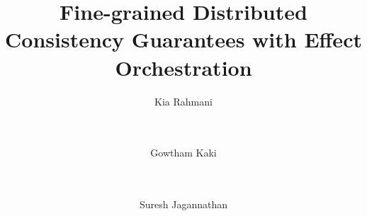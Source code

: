 \documentclass[authorversion]{sig-alternate-05-2015}
\begin{document}






\title{Fine-grained Distributed Consistency Guarantees with Effect
Orchestration}
%
%
%
%
%

%
\author{
%
%
\alignauthor
Kia Rahmani \\ 
       \\
       \\
\and \alignauthor
Gowtham Kaki\\ 
       \\
       \\
\and \alignauthor Suresh Jagannathan\\
       \\
       \\
}
\end{document}
